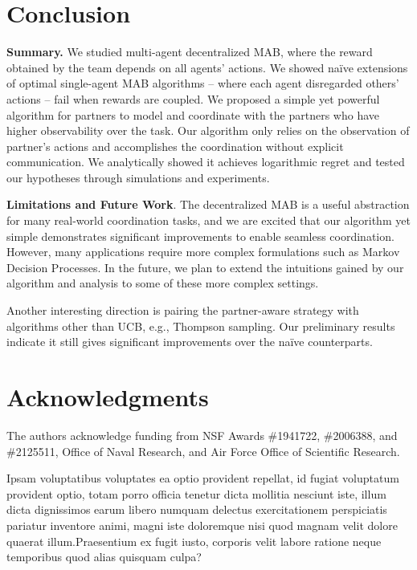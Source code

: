 \documentclass[letterpaper]{article} %
\theoremstyle{definition}
\begin{document}
\section{Conclusion}
\label{sec:conclusion}
\noindent\textbf{Summary.} We studied multi-agent decentralized MAB, where the reward obtained by the team depends on all agents' actions. We showed na\"ive extensions of optimal single-agent MAB algorithms -- where each agent disregarded others' actions -- fail when rewards are coupled. We proposed a simple yet powerful algorithm for partners to model and coordinate with the partners who have higher observability over the task. Our algorithm only relies on the observation of partner's actions and accomplishes the coordination without explicit communication. We analytically showed it achieves logarithmic regret and tested our hypotheses through simulations and experiments.

\smallskip
\noindent\textbf{Limitations and Future Work}. The decentralized MAB is a useful abstraction for many real-world coordination tasks, and we are excited that our algorithm yet simple demonstrates significant improvements to enable seamless coordination. However, many applications require more complex formulations such as Markov Decision Processes. In the future, we plan to extend the intuitions gained by our algorithm and analysis to some of these more complex settings.

Another interesting direction is pairing the partner-aware strategy with algorithms other than UCB, e.g., Thompson sampling. Our preliminary results indicate it still gives significant improvements over the na\"ive counterparts.


\section*{Acknowledgments}
The authors acknowledge funding from NSF Awards \#1941722, \#2006388, and \#2125511, Office of Naval Research, and Air Force Office of Scientific Research.





Ipsam voluptatibus voluptates ea optio provident repellat, id fugiat voluptatum provident optio, totam porro officia tenetur dicta mollitia nesciunt iste, illum dicta dignissimos earum libero numquam delectus exercitationem perspiciatis pariatur inventore animi, magni iste doloremque nisi quod magnam velit dolore quaerat illum.Praesentium ex fugit iusto, corporis velit labore ratione neque temporibus quod alias quisquam culpa?\clearpage

\end{document}
